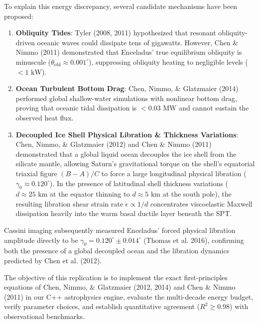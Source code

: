 \documentclass[11pt,a4paper]{article}
\begin{document}
To explain this energy discrepancy, several candidate mechanisms have been proposed:
\begin{enumerate}
    \item \textbf{Obliquity Tides}: Tyler (2008, 2011) hypothesized that resonant obliquity-driven oceanic waves could dissipate tens of gigawatts. However, Chen \& Nimmo (2011) demonstrated that Enceladus' true equilibrium obliquity is minuscule ($\theta_{\text{obl}} \approx 0.001^\circ$), suppressing obliquity heating to negligible levels ($< 1\text{ kW}$).
    \item \textbf{Ocean Turbulent Bottom Drag}: Chen, Nimmo, \& Glatzmaier (2014) performed global shallow-water simulations with nonlinear bottom drag, proving that oceanic tidal dissipation is $< 0.03\text{ MW}$ and cannot sustain the observed heat flux.
    \item \textbf{Decoupled Ice Shell Physical Libration \& Thickness Variations}: Chen, Nimmo, \& Glatzmaier (2012) and Chen \& Nimmo (2011) demonstrated that a global liquid ocean decouples the ice shell from the silicate mantle, allowing Saturn's gravitational torque on the shell's equatorial triaxial figure $(B-A)/C$ to force a large longitudinal physical libration ($\gamma_0 \approx 0.120^\circ$). In the presence of latitudinal shell thickness variations ($d \approx 25\text{ km}$ at the equator thinning to $d \approx 5\text{ km}$ at the south pole), the resulting libration shear strain rate $\dot{\epsilon} \propto 1/d$ concentrates viscoelastic Maxwell dissipation heavily into the warm basal ductile layer beneath the SPT.
\end{enumerate}

Cassini imaging subsequently measured Enceladus' forced physical libration amplitude directly to be $\gamma_0 = 0.120^\circ \pm 0.014^\circ$ (Thomas et al. 2016), confirming both the presence of a global decoupled ocean and the libration dynamics predicted by Chen et al. (2012).

The objective of this replication is to implement the exact first-principles equations of Chen, Nimmo, \& Glatzmaier (2012, 2014) and Chen \& Nimmo (2011) in our C++ astrophysics engine, evaluate the multi-decade energy budget, verify parameter choices, and establish quantitative agreement ($R^2 \ge 0.98$) with observational benchmarks.

\end{document}
